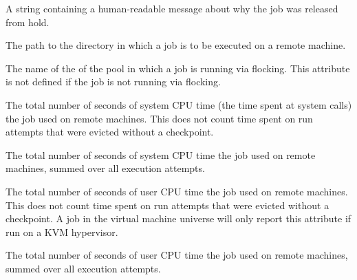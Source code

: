 \begin{description}
\item[\AdAttr{ReleaseReason}:]     A string containing a human-readable
message about why the job was released from hold.

\item[\AdAttr{RemoteIwd}:]  The path to the directory in which
a job is to be executed on a remote machine.

\item[\AdAttr{RemotePool}:]  The name of the  of the pool 
in which a job is running via flocking.  
This attribute is not defined if the job is not running via flocking.

\item[\AdAttr{RemoteSysCpu}:]  The total number of seconds
of system CPU time (the time spent at system calls) the job used
on remote machines.  This does not count time spent on run attempts that
were evicted without a checkpoint.

\item[\AdAttr{CumulativeRemoteSysCpu}:]  The total number of seconds
of system CPU time the job used on remote machines, summed over all
execution attempts.

\item[\AdAttr{RemoteUserCpu}:]  The total number of seconds
of user CPU time the job used on remote machines.  This does not
count time spent on run attempts that were evicted without a checkpoint.
A job in the virtual machine universe will only report this attribute if run
on a KVM hypervisor.

\item[\AdAttr{CumulativeRemoteUserCpu}:]  The total number of seconds
of user CPU time the job used on remote machines, summed over all
execution attempts.


\end{description}

